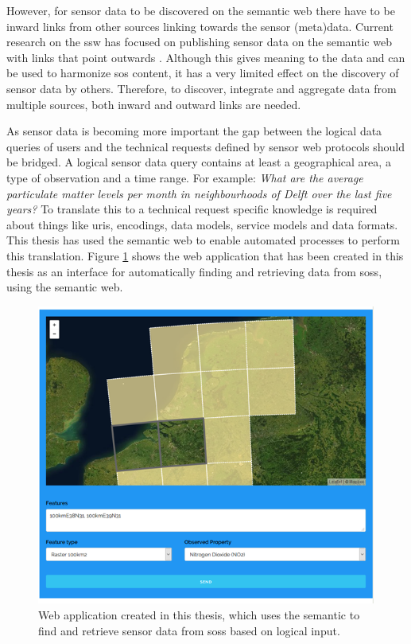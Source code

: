 However, for sensor data to be discovered on the semantic web there have to be inward links from other sources linking towards the sensor (meta)data. Current research on the \ac{ssw} has focused on publishing sensor data on the semantic web with links that point outwards \citep{SSW:Atkinson, SSW:Janowicz, SSW:Pschorr}. Although this gives meaning to the data and can be used to harmonize \ac{sos} content, it has a very limited effect on the discovery of sensor data by others. Therefore, to discover, integrate and aggregate data from multiple sources, both inward and outward links are needed.  

As sensor data is becoming more important the gap between the logical data queries of users and the technical requests defined by sensor web protocols should be bridged. A logical sensor data query contains at least a geographical area, a type of observation and a time range. For example: \textit{What are the average particulate matter levels per month in neighbourhoods of Delft over the last five years?} To translate this to a technical request specific knowledge is required about things like \acp{uri}, encodings, data models, service models and data formats. This thesis has used the semantic web to enable automated processes to perform this translation. Figure \ref{fig:logical} shows the web application that has been created in this thesis as an interface for automatically finding and retrieving data from \aclp{sos}, using the semantic web. 



\begin{figure}
	\centering
	\includegraphics[width=0.8\linewidth]{figs/interface1.PNG}
	\caption{Web application created in this thesis, which uses the semantic to find and retrieve sensor data from \aclp*{sos} based on logical input.}
	\label{fig:logical}
\end{figure}


